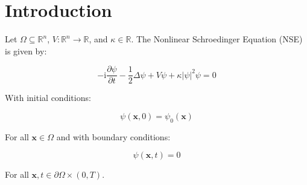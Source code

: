 \documentclass{article}
\newcommand{\bvec}[1]{\boldsymbol{#1}}
\newcommand{\ii}{\mathrm{i}}
\begin{document}
\section{Introduction}

Let $\Omega \subseteq \mathbb{R}^n$,
$V : \mathbb{R}^n \rightarrow \mathbb{R}$,
and $\kappa \in \mathbb{R}$.
The Nonlinear Schroedinger Equation (NSE) is given by:

\begin{equation}
-\ii \frac{\partial \psi}{\partial t} - \frac{1}{2} \Delta \psi + V\psi + \kappa |\psi|^2 \psi = 0
\end{equation}

\noindent With initial conditions:

\begin{equation}
\psi(\bvec{x}, 0) = \psi_0(\bvec{x})
\end{equation}

\noindent For all $\bvec{x} \in \Omega$ and with boundary conditions:

\begin{equation}
\psi(\bvec{x}, t) = 0
\end{equation}

\noindent For all $\bvec{x}, t \in \partial \Omega \times (0, T)$.
\end{document}

